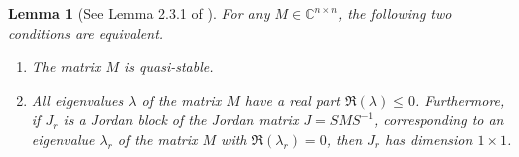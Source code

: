 \documentclass{article}
\theoremstyle{plain}%
\newtheorem{lemma}{Lemma}%
\theoremstyle{definition}%
\theoremstyle{remark}%
\newcommand{\bC}{\mathbb{C}}
\newcommand{\+}[1]{{\bm{#1}}}
\begin{document}
\begin{lemma}[See Lemma 2.3.1 of \cite{kreiss_initial-boundary_2004}]
  \label{lemma:QS_character}
  For any $M \in \bC^{n \times n}$, the following two conditions are 
  equivalent.
  \begin{enumerate}
    \item The matrix $M$ is quasi-stable. 
    \item All eigenvalues $\lambda$ of the matrix $M$ have a real 
      part $\Re(\lambda) \le 0$. Furthermore, if $J_r$ is a Jordan 
      block of the Jordan matrix $J = S M S^{-1}$, corresponding 
      to an eigenvalue $\lambda_r$ of the matrix $M$ with 
      $\Re(\lambda_r) = 0$, then $J_r$ has dimension $1 \times 1$.
  \end{enumerate}
\end{lemma}
\end{document}

